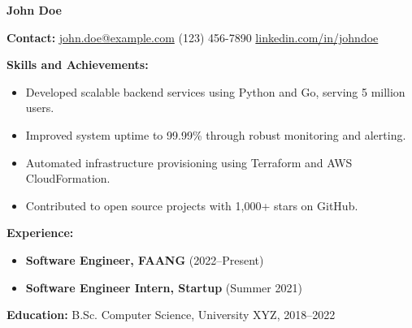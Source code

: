 \documentclass[a4paper,10pt]{article}
\begin{document}
\centerline{\LARGE \textbf{John Doe}}

\medskip

\noindent\textbf{Contact:} \href{mailto:john.doe@example.com}{john.doe@example.com} \textbar{} (123) 456-7890 \textbar{} \href{https://linkedin.com/in/johndoe}{linkedin.com/in/johndoe}

\medskip

\noindent\textbf{Skills and Achievements:}

\begin{itemize}[leftmargin=*]
    \item Developed scalable backend services using Python and Go, serving 5 million users.
    \item Improved system uptime to 99.99\% through robust monitoring and alerting.
    \item Automated infrastructure provisioning using Terraform and AWS CloudFormation.
    \item Contributed to open source projects with 1,000+ stars on GitHub.
\end{itemize}

\medskip

\noindent\textbf{Experience:}

\begin{itemize}[leftmargin=*]
    \item \textbf{Software Engineer, FAANG} (2022–Present)
    \item \textbf{Software Engineer Intern, Startup} (Summer 2021)
\end{itemize}

\medskip

\noindent\textbf{Education:} B.Sc. Computer Science, University XYZ, 2018–2022
\end{document}
